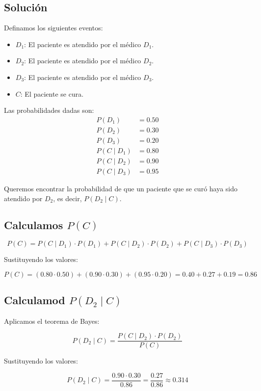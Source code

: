 \documentclass[12pt,a4paper]{article}
\begin{document}
\subsection*{Solución}

Definamos los siguientes eventos:
\begin{itemize}
    \item \( D_1 \): El paciente es atendido por el médico \( D_1 \).
    \item \( D_2 \): El paciente es atendido por el médico \( D_2 \).
    \item \( D_3 \): El paciente es atendido por el médico \( D_3 \).
    \item \( C \): El paciente se cura.
\end{itemize}

Las probabilidades dadas son:
\begin{align*}
P(D_1) &= 0.50 \\
P(D_2) &= 0.30 \\
P(D_3) &= 0.20 \\
P(C \mid D_1) &= 0.80 \\
P(C \mid D_2) &= 0.90 \\
P(C \mid D_3) &= 0.95
\end{align*}

Queremos encontrar la probabilidad de que un paciente que se curó haya sido atendido por \( D_2 \), es decir, \( P(D_2 \mid C) \).

\subsection*{Calculamos \( P(C) \)}

\[
P(C) = P(C \mid D_1) \cdot P(D_1) + P(C \mid D_2) \cdot P(D_2) + P(C \mid D_3) \cdot P(D_3)
\]

Sustituyendo los valores:

\[
P(C) = (0.80 \cdot 0.50) + (0.90 \cdot 0.30) + (0.95 \cdot 0.20) = 0.40 + 0.27 + 0.19 = 0.86
\]

\subsection*{Calculamod \( P(D_2 \mid C) \)}

Aplicamos el teorema de Bayes:

\[
P(D_2 \mid C) = \frac{P(C \mid D_2) \cdot P(D_2)}{P(C)}
\]

Sustituyendo los valores:

\[
P(D_2 \mid C) = \frac{0.90 \cdot 0.30}{0.86} = \frac{0.27}{0.86} \approx 0.314
\]
\end{document}

